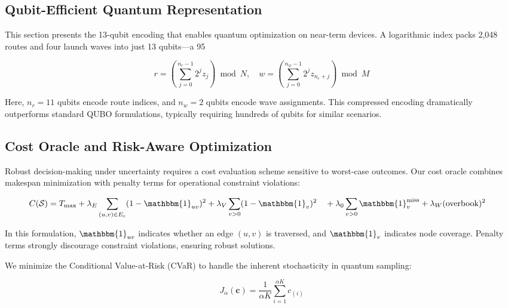 \subsection{Qubit-Efficient Quantum Representation}

This section presents the 13-qubit encoding that enables quantum optimization on near-term devices. A logarithmic index packs 2,048 routes and four launch waves into just 13 qubits—a 95%

\begin{equation}
r = \left(\sum_{j=0}^{n_r-1} 2^{j} z_j\right) \bmod N, \quad 
w = \left(\sum_{j=0}^{n_w-1} 2^{j} z_{n_r+j}\right) \bmod M
\label{eq:encoding}
\end{equation}

Here, $n_r=11$ qubits encode route indices, and $n_w=2$ qubits encode wave assignments. This compressed encoding dramatically outperforms standard QUBO formulations, typically requiring hundreds of qubits for similar scenarios.

\subsection{Cost Oracle and Risk-Aware Optimization}

Robust decision-making under uncertainty requires a cost evaluation scheme sensitive to worst-case outcomes. Our cost oracle combines makespan minimization with penalty terms for operational constraint violations:

\begin{equation}
\begin{split}
C(\mathcal{S}) &= T_{\max} + \lambda_E \sum_{(u,v)\in E_c} (1-\mathbbm{1}_{uv})^2 + \lambda_V \sum_{v>0}(1-\mathbbm{1}_v)^2 
\quad + \lambda_0 \sum_{v>0}\mathbbm{1}_v^{\text{miss}} + \lambda_W (\text{overbook})^2
\end{split}
\label{eq:cost}
\end{equation}

In this formulation, $\mathbbm{1}_{uv}$ indicates whether an edge $(u,v)$ is traversed, and $\mathbbm{1}_v$ indicates node coverage. Penalty terms strongly discourage constraint violations, ensuring robust solutions.

We minimize the Conditional Value-at-Risk (CVaR) to handle the inherent stochasticity in quantum sampling:

\begin{equation}
J_{\alpha}(\mathbf{c}) = \frac{1}{\alpha K}\sum_{i=1}^{\alpha K} c_{(i)}
\label{eq:cvar}
\end{equation}

